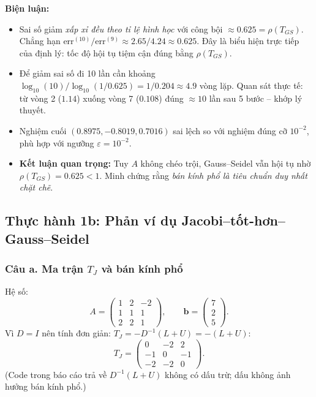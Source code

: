 \documentclass[12pt,a4paper]{article}
\begin{document}
\textbf{Biện luận:}
\begin{itemize}
    \item Sai số giảm \emph{xấp xỉ đều theo tỉ lệ hình học} với công bội $\approx 0.625 = \rho(T_{GS})$. Chẳng hạn $\mathrm{err}^{(10)}/\mathrm{err}^{(9)} \approx 2.65/4.24 \approx 0.625$. Đây là biểu hiện trực tiếp của định lý: tốc độ hội tụ tiệm cận đúng bằng $\rho(T_{GS})$.
    \item Để giảm sai số đi 10 lần cần khoảng $\log_{10}(10)/\log_{10}(1/0.625) = 1/0.204 \approx 4.9$ vòng lặp. Quan sát thực tế: từ vòng 2 ($1.14$) xuống vòng 7 ($0.108$) đúng $\approx 10$ lần sau 5 bước -- khớp lý thuyết.
    \item Nghiệm cuối $(0.8975, -0.8019, 0.7016)$ sai lệch so với nghiệm đúng cỡ $10^{-2}$, phù hợp với ngưỡng $\varepsilon = 10^{-2}$.
    \item \textbf{Kết luận quan trọng:} Tuy $A$ không chéo trội, Gauss--Seidel vẫn hội tụ nhờ $\rho(T_{GS}) = 0.625 < 1$. Minh chứng rằng \emph{bán kính phổ là tiêu chuẩn duy nhất chặt chẽ}.
\end{itemize}

\subsection{Thực hành 1b: Phản ví dụ Jacobi--tốt-hơn--Gauss--Seidel}

\subsubsection{Câu a. Ma trận $T_J$ và bán kính phổ}

Hệ số:
\[
    A = \begin{pmatrix} 1 & 2 & -2 \\ 1 & 1 & 1 \\ 2 & 2 & 1 \end{pmatrix}, \qquad
    \mathbf{b} = \begin{pmatrix} 7 \\ 2 \\ 5 \end{pmatrix}.
\]
Vì $D = I$ nên tính đơn giản: $T_J = -D^{-1}(L+U) = -(L+U)$:
\[
    T_J = \begin{pmatrix} 0 & -2 & 2 \\ -1 & 0 & -1 \\ -2 & -2 & 0 \end{pmatrix}.
\]
(Code trong báo cáo trả về $D^{-1}(L+U)$ không có dấu trừ; dấu không ảnh hưởng bán kính phổ.)
\end{document}
